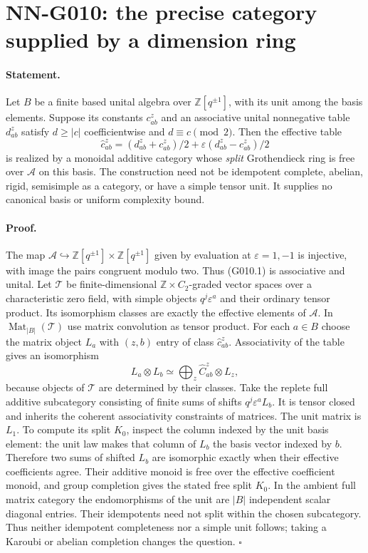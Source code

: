 \section{NN-G010: the precise category supplied by a dimension ring}
\paragraph{Statement.}
Let $B$ be a finite based unital algebra over
$\mathbb Z[q^{\pm1}]$, with its unit among the basis elements.
Suppose its constants $c_{ab}^z$ and an associative unital
nonnegative table $d_{ab}^z$ satisfy
$d\ge|c|$ coefficientwise and $d\equiv c\pmod2$.
Then the effective table
\[
 \widehat c_{ab}^z=(d_{ab}^z+c_{ab}^z)/2
                +\varepsilon(d_{ab}^z-c_{ab}^z)/2
 \tag{G010.1}
\]
is realized by a monoidal additive category whose \emph{split}
Grothendieck ring is free over $\mathcal A$ on this basis. The
construction need not be idempotent complete, abelian, rigid,
semisimple as a category, or have a simple tensor unit. It
supplies no canonical basis or uniform complexity bound.

\paragraph{Proof.}
The map $\mathcal A\hookrightarrow
\mathbb Z[q^{\pm1}]\times\mathbb Z[q^{\pm1}]$ given by
evaluation at $\varepsilon=1,-1$ is injective, with image the
pairs congruent modulo two. Thus (G010.1) is associative and
unital. Let $\mathcal T$ be finite-dimensional
$\mathbb Z\times C_2$-graded vector spaces over a characteristic
zero field, with simple objects $q^j\varepsilon^a$ and their
ordinary tensor product. Its isomorphism classes are exactly
the effective elements of $\mathcal A$.
In $\operatorname{Mat}_{|B|}(\mathcal T)$ use matrix convolution
as tensor product. For each $a\in B$ choose the matrix object
$L_a$ with $(z,b)$ entry of class $\widehat c_{ab}^z$.
Associativity of the table gives an isomorphism
\[
 L_a\otimes L_b\simeq\bigoplus_z
        \widehat C_{ab}^z\otimes L_z,
\]
because objects of $\mathcal T$ are determined by their classes.
Take the replete full additive subcategory consisting of finite
sums of shifts $q^j\varepsilon^aL_b$. It is tensor closed and
inherits the coherent associativity constraints of matrices.
The unit matrix is $L_1$.
To compute its split $K_0$, inspect the column indexed by the
unit basis element: the unit law makes that column of $L_b$
the basis vector indexed by $b$. Therefore two sums of shifted
$L_b$ are isomorphic exactly when their effective coefficients
agree. Their additive monoid is free over the effective
coefficient monoid, and group completion gives the stated
free split $K_0$.
In the ambient full matrix category the endomorphisms of the
unit are $|B|$ independent scalar diagonal entries. Their
idempotents need not split within the chosen subcategory.
Thus neither idempotent completeness nor a simple unit follows;
taking a Karoubi or abelian completion changes the question.
\hfill$\square$

